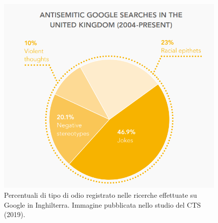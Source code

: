 \begin{figure}
	\includegraphics[width=\linewidth]{figures/google}
	\caption{Percentuali di tipo di odio registrato nelle ricerche effettuate su Google in Inghilterra. Immagine pubblicata nello studio del CTS (2019).}
	\label{google}
\end{figure}

